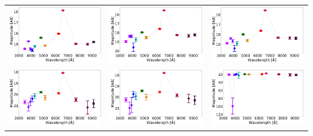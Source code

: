 \begin{table}[!h]
\begin{tabular}{ccc}
\includegraphics[width=0.3\linewidth, clip]{photopectrum_splus_MC0115-229578_aper.pdf} & \includegraphics[width=0.3\linewidth, clip]{photopectrum_splus_MC0115-229578_auto.pdf} & \includegraphics[width=0.3\linewidth, clip]{photopectrum_splus_MC0115-229578_petro.pdf} \\
\includegraphics[width=0.3\linewidth, clip]{photopectrum_splus_MC0115-308119_aper.pdf} & \includegraphics[width=0.3\linewidth, clip]{photopectrum_splus_MC0115-308119_auto.pdf} & \includegraphics[width=0.3\linewidth, clip]{photopectrum_splus_MC0115-308119_petro.pdf} \\

\end{tabular}
\end{table}

